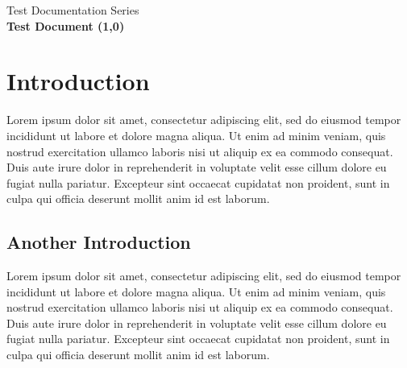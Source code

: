 \documentclass[12pt]{article}
\begin{document}

\begin{center}
	Test Documentation Series
	\\
	\LARGE\bfseries Test Document
	\line(1,0){\textwidth}
\end{center}



\section{Introduction}
Lorem ipsum dolor sit amet, consectetur adipiscing elit, sed do eiusmod tempor incididunt ut labore et dolore magna aliqua. Ut enim ad minim veniam, quis nostrud exercitation ullamco laboris nisi ut aliquip ex ea commodo consequat. Duis aute irure dolor in reprehenderit in voluptate velit esse cillum dolore eu fugiat nulla pariatur. Excepteur sint occaecat cupidatat non proident, sunt in culpa qui officia deserunt mollit anim id est laborum.\cite{test}

\subsection{Another Introduction}
Lorem ipsum dolor sit amet, consectetur adipiscing elit, sed do eiusmod tempor incididunt ut labore et dolore magna aliqua. Ut enim ad minim veniam, quis nostrud exercitation ullamco laboris nisi ut aliquip ex ea commodo consequat. Duis aute irure dolor in reprehenderit in voluptate velit esse cillum dolore eu fugiat nulla pariatur. Excepteur sint occaecat cupidatat non proident, sunt in culpa qui officia deserunt mollit anim id est laborum.\cite{test}
\end{document}
